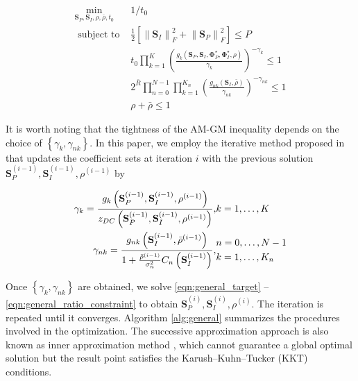 \begin{eqnarray}
  {\mathop {\min }\limits_{{{\mathbf{S}}_P},{{\mathbf{S}}_I},\rho ,\bar \rho ,{t_0}} }&{1/{t_0}} \label{eqn:general_target} \\
  {{\text{ subject to }}}&{\frac{1}{2}\left[ {\left\| {{{\mathbf{S}}_I}} \right\|_F^2 + \left\| {{{\mathbf{S}}_P}} \right\|_F^2} \right] \leqslant P} \label{eqn:general_power_constraint} \\
  {}&{{t_0}\prod\limits_{k = 1}^K {{{\left( {\frac{{{g_k}\left( {{{\mathbf{S}}_P},{{\mathbf{S}}_I},{\mathbf{\Phi }}_P^ \star ,{\mathbf{\Phi }}_I^ \star ,\rho } \right)}}{{{\gamma _k}}}} \right)}^{ - {\gamma _k}}}}  \leqslant 1} \label{eqn:general_current_constraint} \\
  {}&{2^{\bar R}}\prod\limits_{n = 0}^{N - 1} {\prod\limits_{k = 1}^{{K_n}} {{{\left( {\frac{{{g_{nk}}\left( {{{\mathbf{S}}_I},\bar \rho } \right)}}{{{\gamma _{nk}}}}} \right)}^{ - {\gamma _{nk}}}}} }  \leqslant 1 \label{eqn:general_rate_constraint} \\
  {}&{\rho  + \bar \rho  \leqslant 1} \label{eqn:general_ratio_constraint}
\end{eqnarray}

It is worth noting that the tightness of the AM-GM inequality depends on the choice of $\left\{ {{\gamma _k},{\gamma _{nk}}} \right\}$. In this paper, we employ the iterative method proposed in \cite{Clerckx2018} that updates the coefficient sets at iteration $i$ with the previous solution ${{\mathbf{S}}_P^{(i - 1)},{\mathbf{S}}_I^{(i - 1)},{\rho ^{(i - 1)}}}$ by

\begin{eqnarray}
  {{\gamma _k} = \frac{{{g_k}\left( {{\mathbf{S}}_P^{(i - 1)},{\mathbf{S}}_I^{(i - 1)},{\rho ^{(i - 1)}}} \right)}}{{{z_{DC}}\left( {{\mathbf{S}}_P^{(i - 1)},{\mathbf{S}}_I^{(i - 1)},{\rho ^{(i - 1)}}} \right)}},}&{k = 1, \ldots ,K} \\
  {{\gamma _{nk}} = \frac{{{g_{nk}}\left( {{\mathbf{S}}_I^{(i - 1)},{{\bar \rho }^{(i - 1)}}} \right)}}{{1 + \frac{{{{\bar \rho }^{(i - 1)}}}}{{\sigma _n^2}}{C_n}\left( {{\mathbf{S}}_I^{(i - 1)}} \right)}},}&\begin{gathered}
  n = 0, \ldots ,N - 1 \hfill \\
  k = 1, \ldots ,{K_n} \hfill \\
\end{gathered}
\end{eqnarray}

Once $\left\{ {{\gamma _k},{\gamma _{nk}}} \right\}$ are obtained, we solve \eqref{eqn:general_target} -- \eqref{eqn:general_ratio_constraint} to obtain ${\mathbf{S}}_P^{(i)},{\mathbf{S}}_I^{(i)},{\rho ^{(i)}}$. The iteration is repeated until it converges. Algorithm \ref{alg:general} summarizes the procedures involved in the optimization. The successive approximation approach is also known as inner approximation method \cite{Marks1978}, which cannot guarantee a global optimal solution but the result point satisfies the Karush–Kuhn–Tucker (KKT) conditions.

